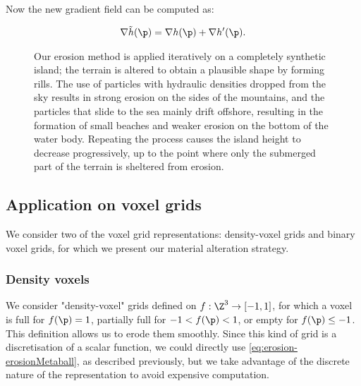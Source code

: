 Now the new gradient field can be computed as: 

\begin{align*}
    \nabla \Tilde{h}(\p) = \nabla h(\p) + \nabla h'(\p).
\end{align*}

\begin{figure}
    \caption{Our erosion method is applied iteratively on a completely synthetic island; the terrain is altered to obtain a plausible shape by forming rills. The use of particles with hydraulic densities dropped from the sky results in strong erosion on the sides of the mountains, and the particles that slide to the sea mainly drift offshore, resulting in the formation of small beaches and weaker erosion on the bottom of the water body. Repeating the process causes the island height to decrease progressively, up to the point where only the submerged part of the terrain is sheltered from erosion.}
    \label{fig:erosion-continuous-erosion}
\end{figure}

\subsection{Application on voxel grids}
\label{sec:erosion-application_on_voxels}

We consider two of the voxel grid representations: density-voxel grids and binary voxel grids, for which we present our material alteration strategy.

\subsubsection{Density voxels}
\label{sec:erosion-application_on_density_voxels}

We consider "density-voxel" grids defined on $f: \Z^3 \to [-1, 1]$, for which a voxel is full for $f(\p) = 1$, partially full for $-1 < f(\p) < 1$, or empty for $f(\p) \leq -1$.  
This definition allows us to erode them smoothly.  
Since this kind of grid is a discretisation of a scalar function, we could directly use \eqref{eq:erosion-erosionMetaball}, as described previously, but we take advantage of the discrete nature of the representation to avoid expensive computation. 

